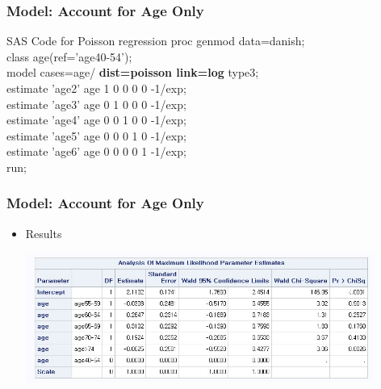 \documentclass[10pt,xcolor={svgnames},t]{beamer}
\begin{document}
%
%
\begin{frame}
	\frametitle{Model: Account for Age Only}
	
	\begin{block}{SAS Code for Poisson regression}
		proc genmod data=danish; \\
		class age(ref='age40-54'); \\
		model cases=age/ \textbf{dist=poisson link=log} type3; \\
		estimate 'age2' age 1 0 0 0 0 -1/exp;\\
		estimate 'age3' age 0 1 0 0 0 -1/exp;\\
		estimate 'age4' age 0 0 1 0 0 -1/exp;\\
		estimate 'age5' age 0 0 0 1 0 -1/exp;\\
		estimate 'age6' age 0 0 0 0 1 -1/exp;\\
		run;
	\end{block}
	
	
\end{frame}
%
%
\begin{frame}
	\frametitle{Model: Account for Age Only}
	
	\begin{itemize}
		\item Results
		\begin{center}
			\includegraphics[width=0.9\textwidth]{result1.jpg}
		\end{center}
	\end{itemize}
	
	
\end{frame}
%
%
\end{document}
